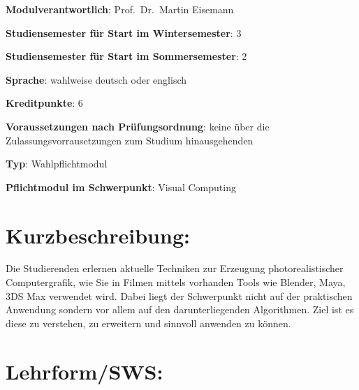 \begin{modulHead}
\textbf{Modulverantwortlich}: Prof.~Dr.~Martin
Eisemann
\end{modulHead}
\begin{modulHead}
\textbf{Studiensemester für
Start im Wintersemester}:
3
\end{modulHead}
\begin{modulHead}
\textbf{Studiensemester für Start
im Sommersemester}:
2
\end{modulHead}
\begin{modulHead}
\textbf{Sprache}: wahlweise deutsch
oder englisch
\end{modulHead}
\begin{modulHead}
\textbf{Kreditpunkte}:
6
\end{modulHead}
\begin{modulHead}
\textbf{Voraussetzungen nach
Prüfungsordnung}: keine über die Zulassungsvorrausetzungen zum Studium
hinausgehenden
\end{modulHead}
\begin{modulHead}
\textbf{Typ}:
Wahlpflichtmodul
\end{modulHead}
\begin{modulHead}
\textbf{Pflichtmodul
im Schwerpunkt}: Visual Computing
\end{modulHead}


\section*{Kurzbeschreibung:\label{/mi-2017/modulbeschreibungen-master/MA_VC_Modul_PhotorealistischeBildsynthese}}\label{kurzbeschreibungpathlabelmi-2017modulbeschreibungen-mastermaux5fvcux5fmodulux5fphotorealistischebildsynthese}

Die Studierenden erlernen aktuelle Techniken zur Erzeugung
photorealistischer Computergrafik, wie Sie in Filmen mittels vorhanden
Tools wie Blender, Maya, 3DS Max verwendet wird. Dabei liegt der
Schwerpunkt nicht auf der praktischen Anwendung sondern vor allem auf
den darunterliegenden Algorithmen. Ziel ist es diese zu verstehen, zu
erweitern und sinnvoll anwenden zu können.

\section*{Lehrform/SWS:\label{/mi-2017/modulbeschreibungen-master/MA_VC_Modul_PhotorealistischeBildsynthese}}\label{lehrformswspathlabelmi-2017modulbeschreibungen-mastermaux5fvcux5fmodulux5fphotorealistischebildsynthese}

